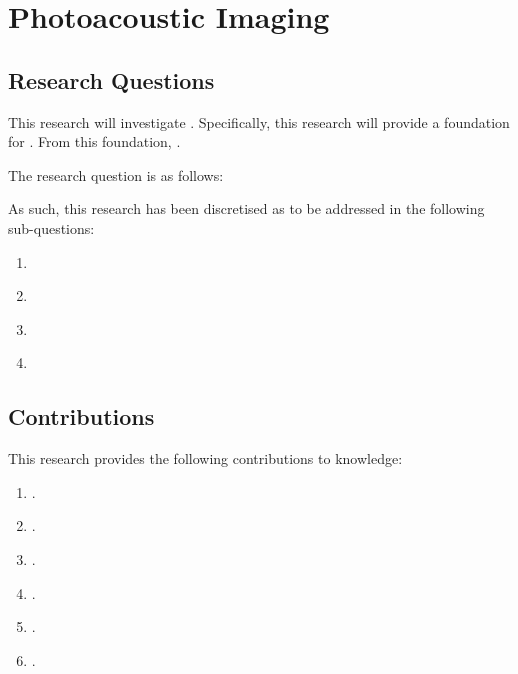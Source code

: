 \lipsum[1-4]
\lipsum[6]

\section{Photoacoustic Imaging} \label{sec:intro}

\subsection{Research Questions}\label{sec:ques}

This research will investigate \lipsum[][1]. Specifically, this research will provide a foundation for \lipsum[][2]. From this foundation, \lipsum[][3].


The research question is as follows:

\begin{quote}
    \textit{\lipsum[][4]}
\end{quote}

\lipsum[][5-6]
As such, this research has been discretised as to be addressed in the following sub-questions:

\begin{enumerate}[start=1,label={RQ\arabic*:},wide = 0pt, leftmargin = 3em]
    \item \textit{\lipsum[][1]}
    \item \textit{\lipsum[][2]}
    \item \textit{\lipsum[][3]}
    \item \textit{\lipsum[][4]}
\end{enumerate}

\lipsum[5-6]

\subsection{Contributions} \label{sec:cont}

This research provides the following contributions to knowledge: 
\begin{enumerate}[start=1,label={C\arabic*:},wide = 0pt, leftmargin = 3em]
	\item \lipsum[][1]. 
	\item \lipsum[][2]. 
	\item \lipsum[][3]. 
	\item \lipsum[][4]. 
	\item \lipsum[][5]. 
	\item \lipsum[][6]. 
\end{enumerate}


